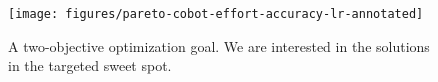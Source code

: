 




 \begin{figure}[t]
 	\begin{center}
 		\texttt{[image: figures/pareto-cobot-effort-accuracy-lr-annotated]}
 		\caption{A two-objective optimization goal. We are interested in the solutions in the targeted sweet spot.}
 		\label{fig:pareto-cobot-effort-accuracy}
 	\end{center}
 \end{figure}



